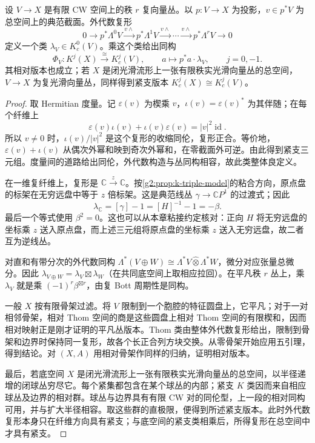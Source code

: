 \begin{proposition}\label{g2:prop:complex-k-thom}
	设 \(V\to X\) 是有限 CW 空间上的秩 \(r\) 复向量丛。以 \(p:V\to X\) 为投影，\(v\in p^*V\) 为总空间上的典范截面。外代数复形
	\[
		0\longrightarrow p^*\Lambda^0V
		\xrightarrow{v\wedge}p^*\Lambda^1V
		\xrightarrow{v\wedge}\cdots
		\xrightarrow{v\wedge}p^*\Lambda^rV\longrightarrow0
	\]
	定义一个类 \(\lambda_V\in K_c^0(V)\)。乘这个类给出同构
	\[
		\Phi_V:K^j(X)\xrightarrow{\cong}K_c^j(V),\qquad
		a\longmapsto p^*a\cdot\lambda_V,\qquad j=0,-1.
	\]
	其相对版本也成立；若 \(X\) 是闭光滑流形上一张有限秩实光滑向量丛的总空间，\(V\to X\) 为复光滑向量丛，同样得到紧支版本 \(K_c^j(X)\cong K_c^j(V)\)。
\end{proposition}
\begin{proof}
	取 Hermitian 度量。记 \(\varepsilon(v)\) 为楔乘 \(v\)，\(\iota(v)=\varepsilon(v)^*\) 为其伴随；在每个纤维上
	\[
		\varepsilon(v)\iota(v)+\iota(v)\varepsilon(v)=|v|^2\operatorname{id}.
	\]
	所以 \(v\ne0\) 时，\(\iota(v)/|v|^2\) 是这个复形的收缩同伦，复形正合。等价地，\(\varepsilon(v)+\iota(v)\) 从偶次外幂和映到奇次外幂和，在零截面外可逆。由此得到紧支三元组。度量间的道路给出同伦，外代数构造与丛同构相容，故此类整体良定义。

	在一维复纤维上，复形是 \(\mathbb C\xrightarrow{z}\mathbb C\)。按\cref{g2:prop:k-triple-model}的粘合方向，原点盘的标架在无穷远盘中等于 \(z\) 倍标架。这是典范线丛 \(\gamma\to\mathbb CP^1\) 的过渡式；因此
	\begin{equation}\label{g2:eq:k-koszul-bott-sign}
		\lambda_{\mathbb C}=[\gamma]-1=[H]^{-1}-1=-\beta.
	\end{equation}
	最后一个等式使用 \(\beta^2=0\)。这也可以从本章粘接约定核对：正向 \(H\) 将无穷远盘的坐标乘 \(z\) 送入原点盘，而上述三元组将原点盘的坐标乘 \(z\) 送入无穷远盘，故二者互为逆线丛。

	对直和有带分次的外代数同构 \(\Lambda^*(V\oplus W)\cong\Lambda^*V\widehat\otimes\Lambda^*W\)，微分对应张量总微分。因此 \(\lambda_{V\oplus W}=\lambda_V\boxtimes\lambda_W\)（在共同底空间上取相应拉回）。在平凡秩 \(r\) 丛上，乘 \(\lambda_V\) 就是乘 \((-1)^r\beta^{\boxtimes r}\)，由复 Bott 周期性是同构。

	一般 \(X\) 按有限骨架过滤。将 \(V\) 限制到一个胞腔的特征圆盘上，它平凡；对于一对相邻骨架，相对 Thom 空间的商是这些圆盘上相对 Thom 空间的有限楔和，因而相对映射正是刚才证明的平凡丛版本。Thom 类由整体外代数复形给出，限制到骨架和边界时保持同一复形，故各个长正合列方块交换。从零骨架开始应用五引理，得到结论。对 \((X,A)\) 用相对骨架作同样的归纳，证明相对版本。

	最后，若底空间 \(X\) 是闭光滑流形上一张有限秩实光滑向量丛的总空间，以半径递增的闭球丛穷尽它。每个紧集都包含在某个球丛的内部；紧支 \(K\) 类因而来自相应球丛及边界的相对群。球丛与边界具有有限 CW 对的同伦型，上一段的相对同构可用，并与扩大半径相容。取这些群的直极限，便得到所述紧支版本。此时外代数复形本身只在纤维方向具有紧支；与底空间的紧支类相乘后，所得复形在总空间中才具有紧支。
\end{proof}

